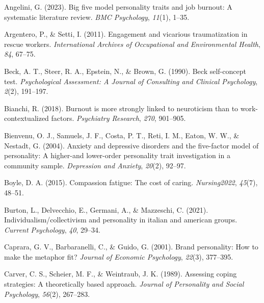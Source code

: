 \documentclass[
  man]{apa7}
\newlength{\cslhangindent}
\newlength{\cslentryspacingunit} %
\newenvironment{CSLReferences}[2] %
 {%
  \setlength{\parindent}{0pt}
  \ifodd #1
  \let\oldpar\par
  \def\par{\hangindent=\cslhangindent\oldpar}
  \fi
  \setlength{\parskip}{#2\cslentryspacingunit}
 }%
 {}
\begin{document}
\hypertarget{refs}{}
\begin{CSLReferences}{1}{0}
\leavevmode{}%
Angelini, G. (2023). Big five model personality traits and job burnout: A systematic literature review. \emph{BMC Psychology}, \emph{11}(1), 1--35.

\leavevmode{}%
Argentero, P., \& Setti, I. (2011). Engagement and vicarious traumatization in rescue workers. \emph{International Archives of Occupational and Environmental Health}, \emph{84}, 67--75.

\leavevmode{}%
Beck, A. T., Steer, R. A., Epstein, N., \& Brown, G. (1990). Beck self-concept test. \emph{Psychological Assessment: A Journal of Consulting and Clinical Psychology}, \emph{2}(2), 191--197.

\leavevmode{}%
Bianchi, R. (2018). Burnout is more strongly linked to neuroticism than to work-contextualized factors. \emph{Psychiatry Research}, \emph{270}, 901--905.

\leavevmode{}%
Bienvenu, O. J., Samuels, J. F., Costa, P. T., Reti, I. M., Eaton, W. W., \& Nestadt, G. (2004). Anxiety and depressive disorders and the five-factor model of personality: A higher-and lower-order personality trait investigation in a community sample. \emph{Depression and Anxiety}, \emph{20}(2), 92--97.

\leavevmode{}%
Boyle, D. A. (2015). Compassion fatigue: The cost of caring. \emph{Nursing2022}, \emph{45}(7), 48--51.

\leavevmode{}%
Burton, L., Delvecchio, E., Germani, A., \& Mazzeschi, C. (2021). Individualism/collectivism and personality in italian and american groups. \emph{Current Psychology}, \emph{40}, 29--34.

\leavevmode{}%
Caprara, G. V., Barbaranelli, C., \& Guido, G. (2001). Brand personality: How to make the metaphor fit? \emph{Journal of Economic Psychology}, \emph{22}(3), 377--395.

\leavevmode{}%
Carver, C. S., Scheier, M. F., \& Weintraub, J. K. (1989). Assessing coping strategies: A theoretically based approach. \emph{Journal of Personality and Social Psychology}, \emph{56}(2), 267--283.


\end{CSLReferences}
\end{document}
